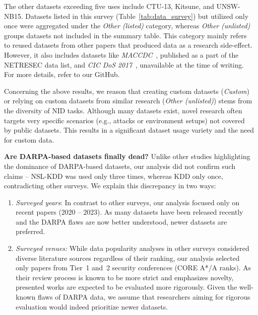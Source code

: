 The other datasets exceeding five uses include CTU-13, Kitsune, and UNSW-NB15. Datasets listed in this survey (Table~\ref{tab:data_survey}) but utilized only once were aggregated under the \emph{Other (listed)} category, whereas \emph{Other (unlisted)} groups datasets not included in the summary table. This category mainly refers to reused datasets from other papers that produced data as a research side-effect. However, it also includes datasets like \emph{MACCDC}~\cite{netresec_maccdc}, published as a part of the NETRESEC data list, and \emph{CIC DoS 2017}~\cite{jazi2017_cic_dos2017_dataset}, unavailable at the time of writing. For more details, refer to our GitHub.

Concerning the above results, we reason that creating custom datasets (\emph{Custom}) or relying on custom datasets from similar research (\emph{Other (unlisted)}) stems from the diversity of NID tasks. Although many datasets exist, novel research often targets very specific scenarios (e.g., attacks or environment setups) not covered by public datasets. This results in a significant dataset usage variety and the need for custom data.

\textbf{Are DARPA-based datasets finally dead?} Unlike other studies highlighting the dominance of DARPA-based datasets, our analysis did not confirm such claims -- NSL-KDD was used only three times, whereas KDD only once, contradicting other surveys. We explain this discrepancy in two ways:

\begin{enumerate}[label=\alph*), topsep=0pt, itemsep=2pt]
    \item \emph{Surveyed years}: In contrast to other surveys, our analysis focused only on recent papers (2020 -- 2023). As many datasets have been released recently and the DARPA flaws are now better understood, newer datasets are preferred.

    \item \emph{Surveyed venues:} While data popularity analyses in other surveys considered diverse literature sources regardless of their ranking, our analysis selected only papers from Tier~1 and~2 security conferences (CORE A*/A ranks). As their review process is known to be more strict and emphasizes novelty, presented works are expected to be evaluated more rigorously. Given the well-known flaws of DARPA data, we assume that researchers aiming for rigorous evaluation would indeed prioritize newer datasets.
\end{enumerate}

